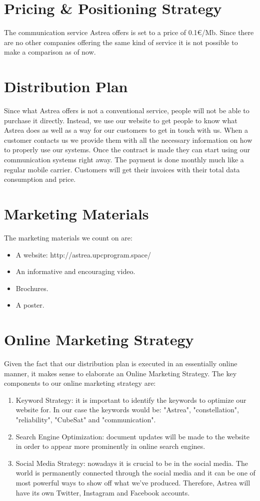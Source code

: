 \section{Pricing \& Positioning Strategy}
The communication service Astrea offers is set to a price of 0.1\euro /Mb. Since there are no other companies offering the same kind of service it is not possible to make a comparison as of now. 

\section{Distribution Plan}
Since what Astrea offers is not a conventional service, people will not be able to purchase it directly. Instead, we use our website to get people to know what Astrea does as well as a way for our customers to get in touch with us. When a customer contacts us we provide them with all the necessary information on how to properly use our systems. Once the contract is made they can start using our communication systems right away. The payment is done monthly much like a regular mobile carrier. Customers will get their invoices with their total data consumption and price.

\section{Marketing Materials}
The marketing materials we count on are:
\begin{itemize}
\item A website: http://astrea.upcprogram.space/
\item An informative and encouraging video.
\item Brochures.
\item A poster.
\end{itemize}

\section{Online Marketing Strategy}
Given the fact that our distribution plan is executed in an essentially online manner, it makes sense to elaborate an Online Marketing Strategy. The key components to our online marketing strategy are:
\begin{enumerate}
\item Keyword Strategy: it is important to identify the keywords to optimize our website for. In our case the keywords would be: "Astrea", "constellation", "reliability", "CubeSat" and "communication".
\item Search Engine Optimization: document updates will be made to the website in order to appear more prominently in online search engines.
\item Social Media Strategy: nowadays it is crucial to be in the social media. The world is permanently connected through the social media and it can be one of most powerful ways to show off what we've produced. Therefore, Astrea will have its own Twitter, Instagram and Facebook accounts.
\end{enumerate}
